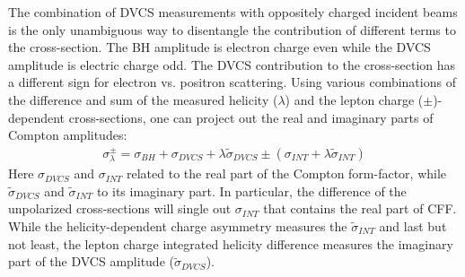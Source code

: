 
The combination of DVCS measurements with oppositely charged incident beams is the only unambiguous way to disentangle the contribution of different terms to the cross-section. The BH amplitude is electron charge even while the DVCS amplitude is electric charge odd. The DVCS contribution to the cross-section has a different sign for electron vs. positron scattering. Using various combinations of the difference and sum of the measured helicity ($\lambda$) and the lepton charge ($\pm$)-dependent cross-sections, one can project out the real and imaginary parts of Compton amplitudes:
\begin{eqnarray}
\sigma_\lambda^{\pm}=\sigma_{BH}+\sigma_{DVCS}+\lambda\tilde{\sigma}_{DVCS}\pm(\sigma_{INT}+\lambda\tilde{\sigma}_{INT})
\end{eqnarray}
Here $\sigma_{DVCS}$ and $\sigma_{INT}$ related to the real part of the Compton form-factor, while $\tilde{\sigma}_{DVCS}$ and $\tilde{\sigma}_{INT}$ to its imaginary part. In particular, the difference of the unpolarized cross-sections will single out $\sigma_{INT}$ that contains the real part of CFF. While the helicity-dependent charge asymmetry measures the ${\tilde \sigma}_{INT}$ and last but not least, the lepton charge integrated helicity difference measures the imaginary part of the DVCS amplitude (${\tilde \sigma}_{DVCS}$). 
%

